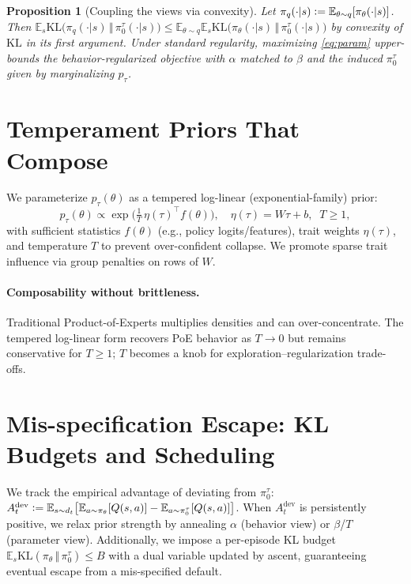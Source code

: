 \documentclass[10pt]{article}
\theoremstyle{plain}
\newtheorem{proposition}{Proposition}
\theoremstyle{definition}
\theoremstyle{remark}
\newcommand{\E}{\mathbb{E}}
\newcommand{\1}{\mathds{1}}
\newcommand{\KL}{\mathrm{KL}}
\newcommand{\defeq}{\vcentcolon=}
\begin{document}
\begin{proposition}[Coupling the views via convexity]
\label{prop:couple}
Let $\pi_q(\cdot|s)\defeq \E_{\theta\sim q}[\pi_\theta(\cdot|s)]$. Then
$\E_s \KL\big(\pi_q(\cdot|s)\,\Vert\, \pi_0^\tau(\cdot|s)\big)\le
\E_{\theta\sim q}\E_s \KL\big(\pi_\theta(\cdot|s)\,\Vert\, \pi_0^\tau(\cdot|s)\big)$
by convexity of $\KL$ in its first argument. Under standard regularity, maximizing \eqref{eq:param} upper-bounds the behavior-regularized objective with $\alpha$ matched to $\beta$ and the induced $\pi_0^\tau$ given by marginalizing $p_\tau$.
\end{proposition}

\section{Temperament Priors That Compose}
\label{sec:priors}
We parameterize $p_\tau(\theta)$ as a tempered log-linear (exponential-family) prior:
\begin{equation}
\label{eq:expfam}
p_\tau(\theta) \propto \exp\!\Big(\tfrac{1}{T}\,\eta(\tau)^\top f(\theta)\Big), \quad
\eta(\tau)=W\tau + b,\;\; T\ge 1,
\end{equation}
with sufficient statistics $f(\theta)$ (e.g., policy logits/features), trait weights $\eta(\tau)$, and temperature $T$ to prevent over-confident collapse. We promote sparse trait influence via group penalties on rows of $W$.

\paragraph{Composability without brittleness.}
Traditional Product-of-Experts multiplies densities and can over-concentrate. The tempered log-linear form recovers PoE behavior as $T\to 0$ but remains conservative for $T\ge 1$; $T$ becomes a knob for exploration--regularization trade-offs.

\section{Mis-specification Escape: KL Budgets and Scheduling}
\label{sec:escape}
We track the empirical advantage of deviating from $\pi_0^\tau$:
$A^\mathrm{dev}_t \defeq \E_{s\sim d_t}\big[ \E_{a\sim \pi_\theta}[Q(s,a)] - \E_{a\sim \pi_0^\tau}[Q(s,a)] \big]$.
When $A^\mathrm{dev}_t$ is persistently positive, we relax prior strength by annealing $\alpha$ (behavior view) or $\beta$/$T$ (parameter view). Additionally, we impose a per-episode KL budget $\E_s \KL(\pi_\theta\,\Vert\,\pi_0^\tau)\le B$ with a dual variable updated by ascent, guaranteeing eventual escape from a mis-specified default.
\end{document}
